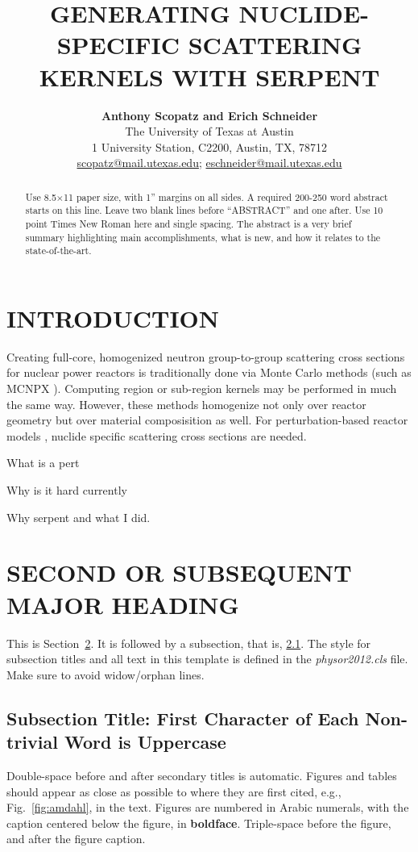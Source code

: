 \documentclass{physor2012}
\title{GENERATING NUCLIDE-SPECIFIC SCATTERING KERNELS WITH SERPENT}
\author{%
  \textbf{Anthony Scopatz and Erich Schneider} \\
  The University of Texas at Austin \\
  1 University Station, C2200, Austin, TX, 78712 \\
  \url{scopatz@mail.utexas.edu}; \url{eschneider@mail.utexas.edu} \\
}
\begin{document}
\maketitle
\begin{abstract}
  Use 8.5$\times$11 paper size, with 1'' margins on all sides.  A required 200-250 
  word abstract starts on this line.  Leave two blank lines before ``ABSTRACT''
  and one after.  Use 10 point Times New Roman here and single 
  spacing. The abstract is a very brief summary highlighting main 
  accomplishments, what is new, and how it relates to the state-of-the-art.
\end{abstract}


\section{INTRODUCTION} 
Creating full-core, homogenized neutron group-to-group scattering cross sections
for nuclear power reactors is traditionally done via Monte Carlo methods (such as
MCNPX \cite{}).  Computing region or sub-region kernels may be performed in much 
the same way.  However, these methods homogenize not only over reactor geometry
but over material composisition as well.  For perturbation-based reactor models 
\cite{}, nuclide specific scattering cross sections are needed.

What is a pert

Why is it hard currently

Why serpent and what I did.

\section{SECOND OR SUBSEQUENT MAJOR HEADING} 
\label{sec:first}
%
This is Section~\ref{sec:first}. It is followed by a subsection, that is, 
\ref{sec:second}. The style for subsection titles and all text in this template is defined in 
the \emph{physor2012.cls} file.  Make sure to avoid widow/orphan lines.
%
\subsection{Subsection Title: First Character of Each Non-trivial Word is Uppercase} 
\label{sec:second}
%
Double-space before and after secondary titles is automatic.  Figures and 
tables should appear as close as possible to where they are first
cited, e.g., Fig.~\ref{fig:amdahl}, in the text.  Figures are numbered in Arabic 
numerals, with the caption centered below the figure, in \textbf{boldface}.  
Triple-space before the figure, and after the figure caption.
\end{document}
